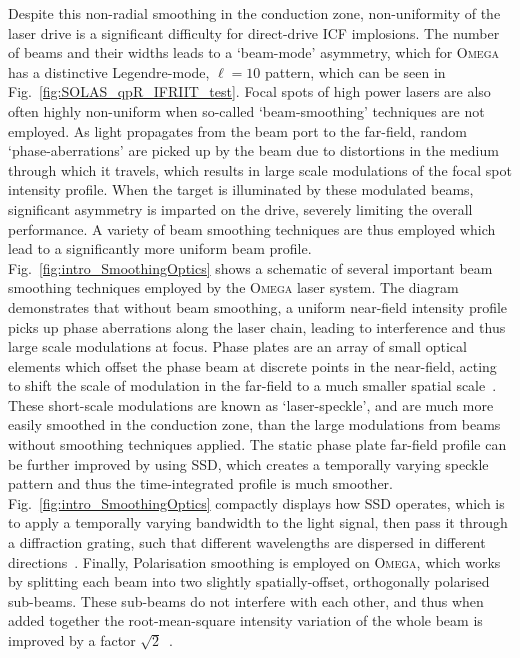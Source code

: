 Despite this non-radial smoothing in the conduction zone, non-uniformity of the laser drive is a significant difficulty for direct-drive \ac{ICF} implosions.
The number of beams and their widths leads to a `beam-mode' asymmetry, which for \textsc{Omega} has a distinctive Legendre-mode, $\ell=10$ pattern, which can be seen in Fig.~\ref{fig:SOLAS_qpR_IFRIIT_test}.
Focal spots of high power lasers are also often highly non-uniform when so-called `beam-smoothing' techniques are not employed.
As light propagates from the beam port to the far-field, random `phase-aberrations' are picked up by the beam due to distortions in the medium through which it travels, which results in large scale modulations of the focal spot intensity profile.
When the target is illuminated by these modulated beams, significant asymmetry is imparted on the drive, severely limiting the overall performance.
A variety of beam smoothing techniques are thus employed which lead to a significantly more uniform beam profile.
Fig.~\ref{fig:intro_SmoothingOptics} shows a schematic of several important beam smoothing techniques employed by the \textsc{Omega} laser system.
The diagram demonstrates that without beam smoothing, a uniform near-field intensity profile picks up phase aberrations along the laser chain, leading to interference and thus large scale modulations at focus.
Phase plates are an array of small optical elements which offset the phase beam at discrete points in the near-field, acting to shift the scale of modulation in the far-field to a much smaller spatial scale~\cite{kato_random_1984}.
These short-scale modulations are known as `laser-speckle', and are much more easily smoothed in the conduction zone, than the large modulations from beams without smoothing techniques applied.
The static phase plate far-field profile can be further improved by using \ac{SSD}, which creates a temporally varying speckle pattern and thus the time-integrated profile is much smoother.
Fig.~\ref{fig:intro_SmoothingOptics} compactly displays how \ac{SSD} operates, which is to apply a temporally varying bandwidth to the light signal, then pass it through a diffraction grating, such that different wavelengths are dispersed in different directions~\cite{skupsky_improved_1989,hohenberger_optical_2016}.
Finally, Polarisation smoothing is employed on \textsc{Omega}, which works by splitting each beam into two slightly spatially-offset, orthogonally polarised sub-beams.
These sub-beams do not interfere with each other, and thus when added together the root-mean-square intensity variation of the whole beam is improved by a factor $\sqrt{2}$~\cite{tsubakimoto_suppression_1992,boehly_reduction_1999}.

